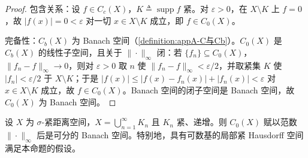 \documentclass[../main.tex]{subfiles}
\begin{document}
\begin{proof}
包含关系：设 $f\in C_c(X)$，$K\triangleq\operatorname{supp}f$ 紧。对 $\varepsilon>0$，在 $X\setminus K$ 上 $f=0$，故 $|f(x)|=0<\varepsilon$ 对一切 $x\in X\setminus K$ 成立，即 $f\in C_0(X)$。

完备性：$C_b(X)$ 为 Banach 空间（\cref{definition:appA-C与Cb}）。$C_0(X)$ 是 $C_b(X)$ 的线性子空间，且关于 $\|\cdot\|_\infty$ 闭：若 $\{f_n\}\subseteq C_0(X)$，$\|f_n-f\|_\infty\to0$，则对 $\varepsilon>0$ 取 $n$ 使 $\|f_n-f\|_\infty<\varepsilon/2$，并取紧集 $K$ 使 $|f_n|<\varepsilon/2$ 于 $X\setminus K$；于是 $|f(x)|\leqslant|f(x)-f_n(x)|+|f_n(x)|<\varepsilon$ 对 $x\in X\setminus K$ 成立，故 $f\in C_0(X)$。Banach 空间的闭子空间是 Banach 空间，故 $C_0(X)$ 为 Banach 空间。
\end{proof}

\begin{proposition}\label{proposition:appA-C0可分}\label{proposition:chA-C0可分}
设 $X$ 为 $\sigma$-紧距离空间，$X=\bigcup_{n=1}^\infty K_n$ 且 $K_n$ 紧、递增。则 $C_0(X)$ 赋以范数 $\|\cdot\|_\infty$ 后是可分的 Banach 空间。特别地，具有可数基的局部紧 Hausdorff 空间满足本命题的假设。
\end{proposition}
\end{document}
